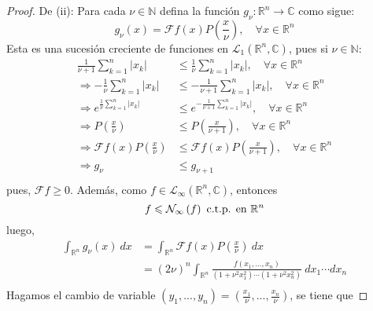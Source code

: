\documentclass[12pt]{report}
\theoremstyle{largebreak}
\renewcommand{\leq}{\ensuremath{\leqslant}}
\renewcommand{\geq}{\ensuremath{\geqslant}}
\newcommand\abs[1]{\ensuremath{\left|#1\right|}}
\newcommand\cf[3]{\ensuremath{#1:#2\rightarrow#3}}
\newcommand{\N}[2]{\ensuremath{\mathcal{N}_{#1}\left(#2\right)}}
\newcommand{\fou}[1]{\ensuremath{\mathcal{F}#1}}
\begin{document}
\begin{proof}
        De (ii): Para cada $\nu\in\mathbb{N}$ defina la función $\cf{g_\nu}{\mathbb{R}^n}{\mathbb{C}}$ como sigue:
        \begin{equation*}
            g_\nu(x)=\fou{f}(x)P\left(\frac{x}{\nu}\right),\quad\forall x\in\mathbb{R}^n
        \end{equation*}
        Esta es una sucesión creciente de funciones en $\mathcal{L}_1(\mathbb{R}^n,\mathbb{C})$, pues si $\nu\in\mathbb{N}$:
        \begin{equation*}
            \begin{split}
                \frac{1}{\nu+1}\sum_{ k=1}^n\abs{x_k}&\leq\frac{1}{\nu}\sum_{ k=1}^n\abs{x_k},\quad\forall x\in\mathbb{R}^n\\
                \Rightarrow -\frac{1}{\nu}\sum_{ k=1}^n\abs{x_k}&\leq-\frac{1}{\nu+1}\sum_{ k=1}^n\abs{x_k},\quad\forall x\in\mathbb{R}^n\\
                \Rightarrow e^{\frac{1}{\nu}\sum_{ k=1}^n\abs{x_k}}&\leq e^{-\frac{1}{\nu+1}\sum_{ k=1}^n\abs{x_k}},\quad\forall x\in\mathbb{R}^n\\
                \Rightarrow P\left(\frac{x}{\nu}\right)&\leq P\left(\frac{x}{\nu+1}\right),\quad\forall x\in\mathbb{R}^n \\
                \Rightarrow  \fou{f}(x)P\left(\frac{x}{\nu}\right)&\leq \fou{f}(x)P\left(\frac{x}{\nu+1}\right),\quad\forall x\in\mathbb{R}^n \\
                \Rightarrow  g_\nu&\leq g_{\nu+1} \\
            \end{split}
        \end{equation*}
        pues, $\fou{f}\geq0$.
        Además, como $f\in\mathcal{L}_{\infty}(\mathbb{R}^n,\mathbb{C})$, entonces
        \begin{equation*}
            f\leq\N{\infty}{f}\textup{ c.t.p. en }\mathbb{R}^n
        \end{equation*}
        luego,
        \begin{equation*}
            \begin{split}
                \int_{\mathbb{R}^n}g_\nu(x)\:dx&=\int_{\mathbb{R}^n}\fou{f}(x)P\left(\frac{x}{\nu}\right)\:dx\\
                &=(2\nu)^n\int_{\mathbb{R}^n}\frac{f(x_1,...,x_n)}{(1+\nu^2x_1^2)\cdots(1+\nu^2x_n^2)}\:dx_1\cdots dx_n\\
            \end{split}
        \end{equation*}
        Hagamos el cambio de variable $(y_1,...,y_n)=(\frac{x_1}{\nu},...,\frac{x_n}{\nu})$, se tiene que

\end{proof}
\end{document}
